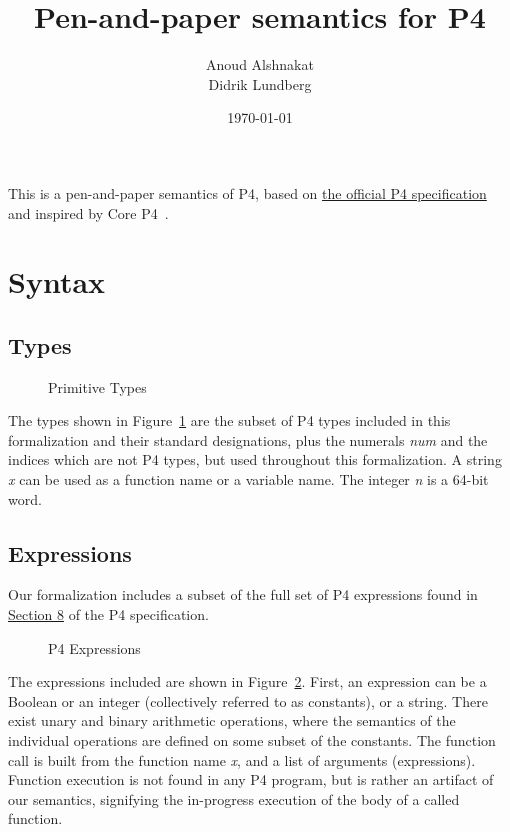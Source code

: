 \documentclass[UTF8]{article}
\title{%
Pen-and-paper semantics for P4}
\author{Anoud Alshnakat\\
Didrik Lundberg
}
\date{\today}
\begin{document}
\maketitle
\noindent
This is a pen-and-paper semantics of P4, based on \href{https://p4.org/p4-spec/docs/P4-16-v1.2.1.html}{the official P4 specification} and inspired by Core P4~\cite{doenges2021petr4}.

\section{Syntax}
\subsection{Types}
\newcommand{\num}{\textit{num}}
\newcommand{\str}{\textit{x}}
\newcommand{\inte}{\textit{n}}
%
%
\begin{figure}[h!]
\centering
\ottmetavars
\caption{Primitive Types}
\label{fig:types}
\end{figure}

The types shown in Figure~\ref{fig:types} are the subset of P4 types included in this formalization and their standard designations, plus the numerals \num{} and the indices which are not P4 types, but used throughout this formalization. A string \str{} can be used as a function name or a variable name. The integer \inte{} is a 64-bit word.

\newpage
\subsection{Expressions}
\newcommand{\fmap}{\textit{F}}

Our formalization includes a subset of the full set of P4 expressions found in \href{https://p4.org/p4-spec/docs/P4-16-v1.2.1.html#sec-exprs}{Section 8} of the P4 specification.

\begin{figure}[h!]
\centering\ottgrammartabular{
\ottexp\ottafterlastrule
}
\caption{P4 Expressions}
\label{fig:exp}
\end{figure}

The expressions included are shown in Figure~\ref{fig:exp}. First, an expression can be a Boolean or an integer (collectively referred to as constants), or a string. There exist unary and binary arithmetic operations, where the semantics of the individual operations are defined on some subset of the constants. The function call is built from the function name \str{}, and a list of arguments (expressions). Function execution is not found in any P4 program, but is rather an artifact of our semantics, signifying the in-progress execution of the body of a called function.
\end{document}
